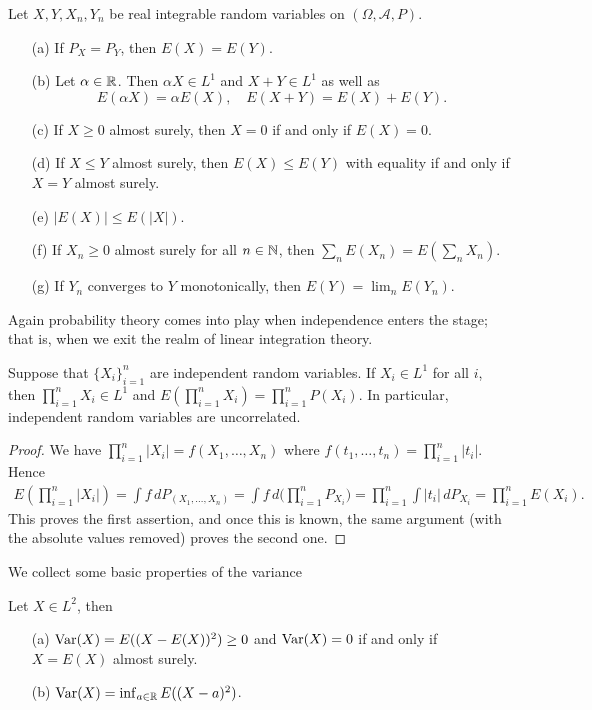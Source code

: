 \begin{theorem}
Let $X,Y,X_n,Y_n$ be real integrable random variables on $(\Omega,\mathcal{A},P)$.
\begin{itemize}
\item[(a)] If $P_X=P_Y$, then $E(X)=E(Y)$.
\item[(b)] Let $\alpha\in\mathbb{R}$. Then $\alpha X\in L^1$ and $X+Y\in L^1$ as well as
\[E(\alpha X)=\alpha E(X),\quad E(X+Y)=E(X)+E(Y).\] 
\item[(c)] If $X\geq 0$ almost surely, then $X=0$ if and only if $E(X)=0$.
\item[(d)] If $X\leq Y$ almost surely, then $E(X)\leq E(Y)$ with equality if
and only if $X=Y$ almost surely.
\item[(e)] $|E(X)|\leq E(|X|)$.
\item[(f)] If $X_n\geq 0$ almost surely for all $n\in\mathbb{N}$, then $\sum_nE(X_n)=E(\sum_nX_n)$.
\item[(g)] If $Y_n$ converges to $Y$ monotonically, then $E(Y)=\lim_nE(Y_n)$.  
\end{itemize}
\end{theorem}
Again probability theory comes into play when independence enters the stage; that is, when we exit the realm of linear integration theory.
\begin{theorem}
Suppose that $\{X_i\}_{i=1}^{n}$ are independent random variables. If $X_i\in L^1$ for all $i$, then $\prod_{i=1}^{n}X_i\in L^1$ and $E(\prod_{i=1}^{n}X_i)=\prod_{i=1}^{n}P(X_i)$. In particular, independent random variables are uncorrelated.
\end{theorem}
\begin{proof}
We have $\prod_{i=1}^{n}|X_i|=f(X_1,\dots,X_n)$ where $f(t_1,\dots,t_n)=\prod_{i=1}^{n}|t_i|$. Hence
\begin{align*}
E(\prod_{i=1}^{n}|X_i|)=\int f\,dP_{(X_1,\dots,X_n)}=\int f\,d\Big(\prod_{i=1}^{n}P_{X_i}\Big)=\prod_{i=1}^{n}\int|t_i|\,dP_{X_i}=\prod_{i=1}^{n}E(X_i).
\end{align*}
This proves the first assertion, and once this is known, the same argument (with the absolute values removed) proves the second one.
\end{proof}
We collect some basic properties of the variance
\begin{theorem}
Let $X\in L^2$, then
\begin{itemize}
\item[(a)] $\mathrm{Var}(X)=E((X-E(X))^2)\geq 0$ and $\mathrm{Var}(X)=0$ if and only if $X=E(X)$ almost surely.
\item[(b)] $\mathrm{Var}(X)=\inf_{a\in\mathbb{R}}E((X-a)^2)$.
\end{itemize}
\end{theorem}
